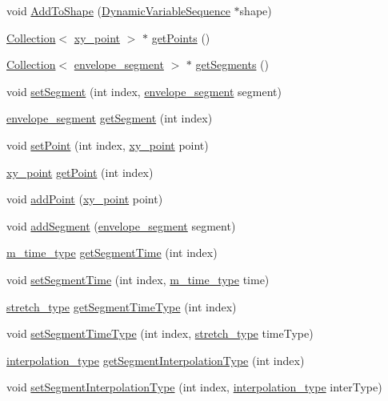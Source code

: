 \begin{CompactItemize}
\item 
void \hyperlink{classDynamicVariableSequence_a9}{Add\-To\-Shape} (\hyperlink{classDynamicVariableSequence}{Dynamic\-Variable\-Sequence} $\ast$shape)
\item 
\hyperlink{classCollection}{Collection}$<$ \hyperlink{structxy__point}{xy\_\-point} $>$ $\ast$ \hyperlink{classDynamicVariableSequence_a10}{get\-Points} ()
\item 
\hyperlink{classCollection}{Collection}$<$ \hyperlink{structenvelope__segment}{envelope\_\-segment} $>$ $\ast$ \hyperlink{classDynamicVariableSequence_a11}{get\-Segments} ()
\item 
void \hyperlink{classDynamicVariableSequence_a12}{set\-Segment} (int index, \hyperlink{structenvelope__segment}{envelope\_\-segment} segment)
\item 
\hyperlink{structenvelope__segment}{envelope\_\-segment} \hyperlink{classDynamicVariableSequence_a13}{get\-Segment} (int index)
\item 
void \hyperlink{classDynamicVariableSequence_a14}{set\-Point} (int index, \hyperlink{structxy__point}{xy\_\-point} point)
\item 
\hyperlink{structxy__point}{xy\_\-point} \hyperlink{classDynamicVariableSequence_a15}{get\-Point} (int index)
\item 
void \hyperlink{classDynamicVariableSequence_a16}{add\-Point} (\hyperlink{structxy__point}{xy\_\-point} point)
\item 
void \hyperlink{classDynamicVariableSequence_a17}{add\-Segment} (\hyperlink{structenvelope__segment}{envelope\_\-segment} segment)
\item 
\hyperlink{Types_8h_a2}{m\_\-time\_\-type} \hyperlink{classDynamicVariableSequence_a18}{get\-Segment\-Time} (int index)
\item 
void \hyperlink{classDynamicVariableSequence_a19}{set\-Segment\-Time} (int index, \hyperlink{Types_8h_a2}{m\_\-time\_\-type} time)
\item 
\hyperlink{Types_8h_a12}{stretch\_\-type} \hyperlink{classDynamicVariableSequence_a20}{get\-Segment\-Time\-Type} (int index)
\item 
void \hyperlink{classDynamicVariableSequence_a21}{set\-Segment\-Time\-Type} (int index, \hyperlink{Types_8h_a12}{stretch\_\-type} time\-Type)
\item 
\hyperlink{Types_8h_a13}{interpolation\_\-type} \hyperlink{classDynamicVariableSequence_a22}{get\-Segment\-Interpolation\-Type} (int index)
\item 
void \hyperlink{classDynamicVariableSequence_a23}{set\-Segment\-Interpolation\-Type} (int index, \hyperlink{Types_8h_a13}{interpolation\_\-type} inter\-Type)

\end{CompactItemize}
